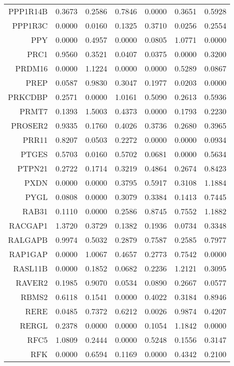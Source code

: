 \begin{longtable}{rrrrrrr}
  PPP1R14B & 0.3673 & 0.2586 & 0.7846 & 0.0000 & 0.3651 & 0.5928 \\ 
  PPP1R3C & 0.0000 & 0.0160 & 0.1325 & 0.3710 & 0.0256 & 0.2554 \\ 
  PPY & 0.0000 & 0.4957 & 0.0000 & 0.0805 & 1.0771 & 0.0000 \\ 
  PRC1 & 0.9560 & 0.3521 & 0.0407 & 0.0375 & 0.0000 & 0.3200 \\ 
  PRDM16 & 0.0000 & 1.1224 & 0.0000 & 0.0000 & 0.5289 & 0.0867 \\ 
  PREP & 0.0587 & 0.9830 & 0.3047 & 0.1977 & 0.0203 & 0.0000 \\ 
  PRKCDBP & 0.2571 & 0.0000 & 1.0161 & 0.5090 & 0.2613 & 0.5936 \\ 
  PRMT7 & 0.1393 & 1.5003 & 0.4373 & 0.0000 & 0.1793 & 0.2230 \\ 
  PROSER2 & 0.9335 & 0.1760 & 0.4026 & 0.3736 & 0.2680 & 0.3965 \\ 
  PRR11 & 0.8207 & 0.0503 & 0.2272 & 0.0000 & 0.0000 & 0.0934 \\ 
  PTGES & 0.5703 & 0.0160 & 0.5702 & 0.0681 & 0.0000 & 0.5634 \\ 
  PTPN21 & 0.2722 & 0.1714 & 0.3219 & 0.4864 & 0.2674 & 0.8423 \\ 
  PXDN & 0.0000 & 0.0000 & 0.3795 & 0.5917 & 0.3108 & 1.1884 \\ 
  PYGL & 0.0808 & 0.0000 & 0.3079 & 0.3384 & 0.1413 & 0.7445 \\ 
  RAB31 & 0.1110 & 0.0000 & 0.2586 & 0.8745 & 0.7552 & 1.1882 \\ 
  RACGAP1 & 1.3720 & 0.3729 & 0.1382 & 0.1936 & 0.0734 & 0.3348 \\ 
  RALGAPB & 0.9974 & 0.5032 & 0.2879 & 0.7587 & 0.2585 & 0.7977 \\ 
  RAP1GAP & 0.0000 & 1.0067 & 0.4657 & 0.2773 & 0.7542 & 0.0000 \\ 
  RASL11B & 0.0000 & 0.1852 & 0.0682 & 0.2236 & 1.2121 & 0.3095 \\ 
  RAVER2 & 0.1985 & 0.9070 & 0.0534 & 0.0890 & 0.2667 & 0.0577 \\ 
  RBMS2 & 0.6118 & 0.1541 & 0.0000 & 0.4022 & 0.3184 & 0.8946 \\ 
  RERE & 0.0485 & 0.7372 & 0.6212 & 0.0026 & 0.9874 & 0.4207 \\ 
  RERGL & 0.2378 & 0.0000 & 0.0000 & 0.1054 & 1.1842 & 0.0000 \\ 
  RFC5 & 1.0809 & 0.2444 & 0.0000 & 0.5248 & 0.1556 & 0.3147 \\ 
  RFK & 0.0000 & 0.6594 & 0.1169 & 0.0000 & 0.4342 & 0.2100 \\ 

\end{longtable}
